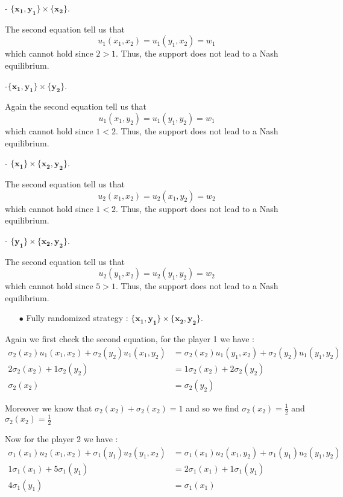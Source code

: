 - $\mathbf{\{x_1,y_1\}}\times\mathbf{\{x_2\}}$.

The second equation tell us that 
\begin{equation*}
    u_1(x_1,x_2)=u_1(y_1,x_2)=w_1
\end{equation*}
which cannot hold since $2>1$. Thus, the support does not lead to a Nash equilibrium.


-$\mathbf{\{x_1,y_1\}}\times\mathbf{\{y_2\}}$.

Again the second equation tell us that 
 \begin{equation*}
    u_1(x_1,y_2)=u_1(y_1,y_2)=w_1
\end{equation*}
which cannot hold since $1<2$. Thus, the support does not lead to a Nash equilibrium.


- $\mathbf{\{x_1\}}\times\mathbf{\{x_2,y_2\}}$.

The second equation tell us that 
 \begin{equation*}
    u_2(x_1,x_2)=u_2(x_1,y_2)=w_2
\end{equation*}
which cannot hold since $1<2$. Thus, the support does not lead to a Nash equilibrium.

- $\mathbf{\{y_1\}}\times\mathbf{\{x_2,y_2\}}$.

The second equation tell us that 
 \begin{equation*}
    u_2(y_1,x_2)=u_2(y_1,y_2)=w_2
\end{equation*}
which cannot hold since $5>1$. Thus, the support does not lead to a Nash equilibrium.


\begin{itemize}
  \item[$\bullet$] Fully randomized strategy : $\mathbf{\{x_1,y_1\}}\times\mathbf{\{x_2,y_2\}}$.
\end{itemize}
Again we first check the second equation, for the player 1 we have : 
\begin{align*}
 \sigma_2(x_2)u_1(x_1,x_2) + \sigma_2(y_2)u_1(x_1,y_2) &= \sigma_2(x_2)u_1(y_1,x_2) + \sigma_2(y_2)u_1(y_1,y_2) \\
 2\sigma_2(x_2)+1\sigma_2(y_2)&= 1\sigma_2(x_2) + 2\sigma_2(y_2) \\
 \sigma_2(x_2)&=\sigma_2(y_2)
\end{align*}

Moreover we know that $\sigma_2(x_2) + \sigma_2(x_2) = 1$ and so we find $\sigma_2(x_2)=\frac{1}{2}$ and $\sigma_2(x_2)=\frac{1}{2}$

Now for the player 2 we have : 
\begin{align*}
 \sigma_1(x_1)u_2(x_1,x_2) + \sigma_1(y_1)u_2(y_1,x_2) &= \sigma_1(x_1)u_2(x_1,y_2) + \sigma_1(y_1)u_2(y_1,y_2) \\
 1\sigma_1(x_1)+5\sigma_1(y_1)&= 2\sigma_1(x_1) + 1\sigma_1(y_1) \\
 4\sigma_1(y_1)&=\sigma_1(x_1)
\end{align*}

